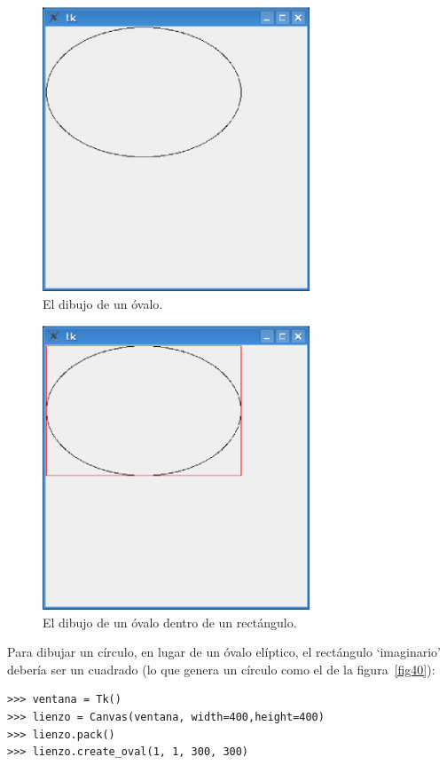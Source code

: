 \begin{figure}
\begin{center}
\includegraphics[width=80mm]{figure38.eps}
\end{center}
\caption{El dibujo de un óvalo.}\label{fig38}
\end{figure}

\begin{figure}
\begin{center}
\includegraphics[width=80mm]{figure39.eps}
\end{center}
\caption{El dibujo de un óvalo dentro de un rectángulo.}\label{fig39}
\end{figure}

\noindent
Para dibujar un círculo, en lugar de un óvalo elíptico, el rectángulo `imaginario' debería ser un cuadrado (lo que genera un círculo como el de la figura~\ref{fig40}):

\begin{listing}
\begin{verbatim}
>>> ventana = Tk()
>>> lienzo = Canvas(ventana, width=400,height=400)
>>> lienzo.pack()
>>> lienzo.create_oval(1, 1, 300, 300)
\end{verbatim}
\end{listing}

